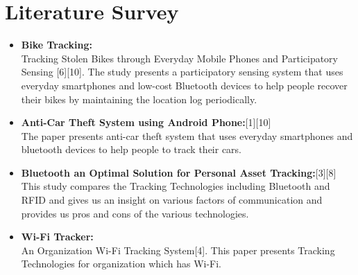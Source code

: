 \documentclass[a4paper,10pt]{report}
\begin{document}
\chapter{Literature Survey}
\begin{itemize}
  \item \textbf{Bike Tracking:}\\Tracking Stolen Bikes through Everyday Mobile Phones and Participatory Sensing [6][10]. The study presents a participatory sensing system that uses everyday smartphones and low-cost Bluetooth devices to help people recover their bikes by maintaining the location log periodically.
  \item \textbf{Anti-Car Theft System using Android Phone:}[1][10]\\The paper presents anti-car theft system that uses everyday smartphones and bluetooth devices to help people to track their cars.
  \item \textbf{Bluetooth an Optimal Solution for Personal Asset Tracking:}[3][8]\\This study compares the Tracking Technologies including Bluetooth and RFID and gives us an insight on various factors of communication and provides us pros and cons of the various technologies.
  \item \textbf{Wi-Fi Tracker:}\\An Organization Wi-Fi Tracking System[4]. This paper presents Tracking Technologies for organization which has Wi-Fi.
\end{itemize}
\end{document}
